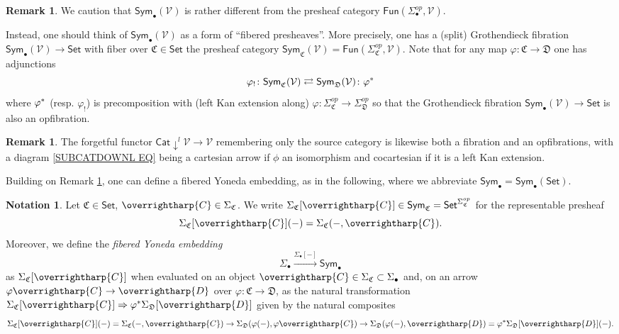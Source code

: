 \documentclass[a4paper,10pt
,draft
]{article}%
\numberwithin{equation}{section}
\numberwithin{figure}{section}
\theoremstyle{definition} %
\newtheorem{remark}[equation]{Remark}%
\newtheorem{notation}[equation]{Notation}%
\newcommand{\vect}[1]{\text{\overrightharp{\ensuremath{#1}}}}
\newcommand{\Sym}{\ensuremath{\mathsf{Sym}}}%
\newcommand{\V}{\ensuremath{\mathcal V}}
\newcommand{\1}{\ensuremath{\mathbbm 1}}%
\begin{document}
\begin{remark}\label{COLCHADJ REM}
We caution that 
$\mathsf{Sym}_{\bullet}(\V)$
is rather different from the presheaf category 
$\mathsf{Fun}(\Sigma_{\bullet}^{op},\V)$.

Instead, one should think of 
$\mathsf{Sym}_{\bullet}(\V)$
as a form of ``fibered presheaves''.
More precisely, 
one has a (split) Grothendieck fibration
$\mathsf{Sym}_{\bullet}(\V) \to \mathsf{Set}$
with fiber over 
$\mathfrak{C} \in \mathsf{Set}$
the presheaf category
$\Sym_{\mathfrak C}(\V)=
\mathsf{Fun}(\Sigma_{\mathfrak{C}}^{op},\mathcal{V})$.
Note that for any map
$\varphi \colon \mathfrak{C} \to \mathfrak{D}$
one has adjunctions
\begin{equation}\label{COLCHADJ EQ}
\varphi_! \colon \Sym_{\mathfrak C}(\V) 
\rightleftarrows 
\Sym_{\mathfrak D}(\V) \colon \varphi^{\**}
\end{equation}
where $\varphi^{\**}$
(resp. $\varphi_!$)
is precomposition with (left Kan extension along)
$\varphi\colon 
\Sigma^{op}_{\mathfrak{C}}
\to 
\Sigma^{op}_{\mathfrak{D}}
$
so that the Grothendieck fibration
$\mathsf{Sym}_{\bullet}(\V) \to \mathsf{Set}$
is also an opfibration. 
\end{remark}


\begin{remark}\label{SUBCOCART REM}
The forgetful functor $\mathsf{Cat} \downarrow^l \mathcal{V} \to \mathcal{V}$
remembering only the source category is likewise both a fibration and an opfibrations, 
with a diagram \eqref{SUBCATDOWNL EQ}
being a cartesian arrow if  $\phi$ an isomorphism
and cocartesian if it is a left Kan extension. 
\end{remark}


Building on Remark \ref{COLCHADJ REM},
one can define a fibered Yoneda embedding, as in the following,
where we abbreviate
$\mathsf{Sym}_{\bullet} = \mathsf{Sym}_{\bullet}(\mathsf{Set})$.

\begin{notation}\label{FIBYON NOT}
Let $\mathfrak{C} \in \mathsf{Set}$, $\vect{C} \in \Sigma_{\mathfrak{C}}$.
We write
$\Sigma_{\mathfrak{C}}[\vect{C}] 
\in \mathsf{Sym}_{\mathfrak{C}} = \mathsf{Set}^{\Sigma_{\mathfrak{C}}^{op}}$ for the representable presheaf
\[\Sigma_{\mathfrak{C}}[\vect{C}](-)
= \Sigma_{\mathfrak{C}}(-,\vect{C}).\]
Moreover, we define the \emph{fibered Yoneda embedding}
\begin{equation}\label{FIBYON EQ}
\Sigma_{\bullet} \xrightarrow{\Sigma_{\bullet}[-]} \mathsf{Sym}_{\bullet}
\end{equation}
as $\Sigma_{\mathfrak{C}}[\vect{C}]$
when evaluated on an object
$\vect{C} \in \Sigma_{\mathfrak{C}} \subset \Sigma_{\bullet}$
and, on an arrow 
$\varphi \vect{C} \to \vect{D}$
over $\varphi \colon \mathfrak{C} \to \mathfrak{D}$,
as the natural transformation
$\Sigma_{\mathfrak{C}}[\vect{C}]
\Rightarrow
\varphi^{\**}
\Sigma_{\mathfrak{D}}[\vect{D}]
$ given by the natural composites
\[\Sigma_{\mathfrak{C}}[\vect{C}](-)
= \Sigma_{\mathfrak{C}}(-,\vect{C})
\to 
\Sigma_{\mathfrak{D}}(\varphi(-),\varphi\vect{C})
\to
\Sigma_{\mathfrak{D}}(\varphi(-),\vect{D})
=
\varphi^{\**} \Sigma_{\mathfrak{D}}[\vect{D}](-).
\]
\end{notation}
\end{document}
